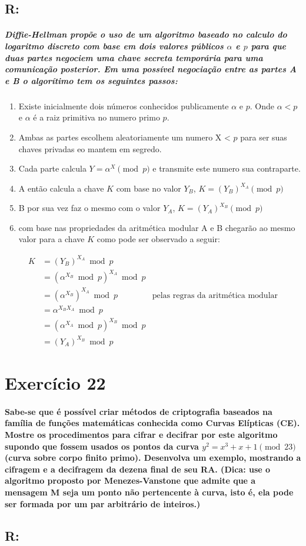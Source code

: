 \documentclass[10pt,a4paper]{report}
\begin{document}
\subsection*{R:}
\subparagraph{Diffie-Hellman propõe o uso de um algoritmo baseado no calculo do logaritmo discreto com base em dois valores públicos $\alpha$ e $p$ para que duas partes negociem uma chave secreta temporária para uma comunicação posterior. Em uma possível negociação entre as partes A e B o algorítimo tem os seguintes passos:}
\begin{enumerate}
\item Existe inicialmente dois números conhecidos publicamente $\alpha$ e $p$. Onde $\alpha < p$ e $\alpha$ é a raiz primitiva no numero primo $p$.
\item Ambas as partes escolhem aleatoriamente um numero X < $p$ para ser suas chaves privadas eo mantem em segredo.
\item Cada parte calcula $Y = \alpha^X \pmod p$ e transmite este numero sua contraparte.
\item A então calcula a chave $K$ com base no valor $Y_B$, $K=(Y_B)^{X_A} \pmod p $
\item B por sua vez faz o mesmo com o valor $Y_A$, $K = (Y_A)^{X_B} \pmod p$
\item com base nas propriedades da aritmética modular A e B chegarão ao mesmo valor para a chave $K$ como pode ser observado a seguir:
\end{enumerate}
\begin{align}
K & = (Y_B)^{X_A} \bmod p \\
& = (\alpha^{X_B} \bmod p)^{X_A} \bmod p \\
& = (\alpha^{X_B})^{X_A} \bmod p  & \textrm{pelas regras da aritmética modular} \\ 
& = \alpha^{X_BX_A} \bmod p \\
& = (\alpha^{X_A} \bmod p)^{X_B} \bmod p \\
& = (Y_A)^{X_B} \bmod p
\end{align}



\section*{Exercício 22}
\paragraph{Sabe-se que é possível criar métodos de criptografia baseados na família de funções matemáticas conhecida como Curvas Elípticas (CE). Mostre os procedimentos para cifrar e decifrar por este algoritmo supondo que fossem usados os pontos da curva $y^2 = x^3 + x + 1 \pmod {23} $ (curva sobre corpo finito primo). Desenvolva um exemplo, mostrando a cifragem e a decifragem da dezena final de seu RA. (Dica: use o algoritmo proposto por Menezes-Vanstone que admite que a mensagem M seja um ponto não pertencente à curva, isto é, ela pode ser formada por um par arbitrário de inteiros.)}
\subsection*{R:}
\end{document}
